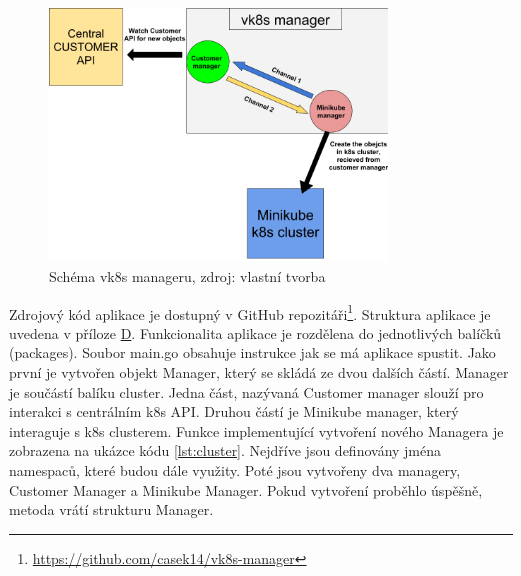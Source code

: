 \begin{figure}[H]
  \begin{centering}
    
	  \includegraphics[width=0.8\textwidth]{images/vk8s.png}
    \par
	  \caption{Schéma vk8s manageru\label{fig:vk8s}, zdroj: vlastní tvorba}
    \end{centering}
\end{figure}

Zdrojový kód aplikace je dostupný v GitHub repozitáři\footnote[1]{\url{https://github.com/casek14/vk8s-manager}}. Struktura aplikace je uvedena v příloze \hyperref[app:struktura]{D}. Funkcionalita aplikace je rozdělena do jednotlivých balíčků (packages). Soubor main.go obsahuje instrukce jak se má aplikace spustit. Jako první je vytvořen objekt Manager, který se skládá ze dvou dalších částí. Manager je součástí balíku cluster. Jedna část, nazývaná Customer manager slouží pro interakci s centrálním k8s API. Druhou částí je Minikube manager, který interaguje s k8s clusterem. Funkce implementující vytvoření nového Managera je zobrazena na ukázce kódu \ref{lst:cluster}. Nejdříve jsou definovány jména namespaců, které budou dále využity. Poté jsou \linebreak vytvořeny dva managery, Customer Manager a Minikube Manager. Pokud vytvoření proběhlo úspěšně, metoda vrátí strukturu Manager. 


